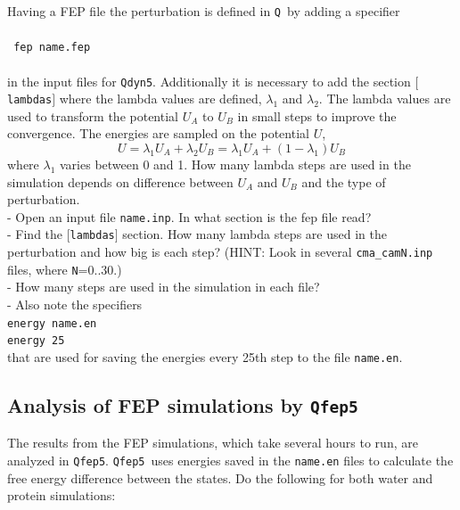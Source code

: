 \documentclass[a4paper,12pt]{article}
\newcommand{\qdyn}{\texttt{Qdyn5}}
\newcommand{\qfep}{\texttt{Qfep5}}
\newcommand{\q}{\texttt{Q}}
\begin{document}
Having a FEP file the perturbation is defined in \q\ by adding a
specifier
\\
\\
\texttt{ fep \hspace{2cm}    name.fep}
\\
\\
in the input files for \qdyn. Additionally it is necessary to add
the section \texttt{$[$lambdas$]$} where the lambda values are
defined, $\lambda_1$ and $\lambda_2$. The lambda values are used
to transform the potential $U_A$ to $U_B$ in small steps to
improve the convergence. The energies are sampled on the potential
$U$,
\begin{equation}
\label{eq:lambda}
U=\lambda_1 U_A + \lambda_2 U_B = \lambda_1 U_A + (1-\lambda_1) U_B
\end{equation}
where $\lambda_1$ varies between 0 and 1. How many lambda steps
are used in the simulation depends on difference between
$U_A$ and $U_B$ and the type of perturbation.\\

- Open an input file \texttt{name.inp}. In what section is the fep file read?\\

- Find the \texttt{$[$lambdas$]$} section. How many lambda steps
are used in the perturbation and how big is each step? (HINT: Look
in several \texttt{cma\_camN.inp} files, where \texttt{N}=0..30.)\\

- How many steps are used in the simulation in each file?\\

- Also note the specifiers\\

\noindent \texttt{energy \hspace{2cm}             name.en}\\
\texttt{energy  \hspace{2cm}                 25}\\

\noindent that are used for saving the energies every 25th step to
the file \texttt{name.en}.
\newpage

\subsection{Analysis of FEP simulations by \qfep}

The results from the FEP simulations, which take several hours
to run, are analyzed in \qfep. \qfep\ uses energies saved
in the \texttt{name.en} files to calculate the free energy
difference between the states. Do the following for both water and protein simulations:\\
\end{document}

